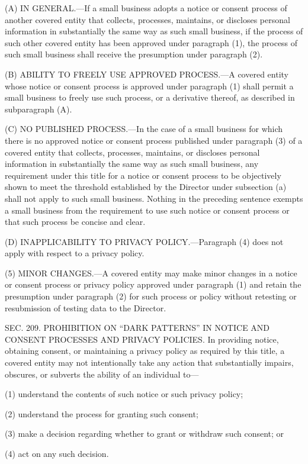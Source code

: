 (A) IN GENERAL.—If a small business adopts a notice or consent process of another covered entity that collects, processes, maintains, or discloses personal information in substantially the same way as such small business, if the process of such other covered entity has been approved under paragraph (1), the process of such small business shall receive the presumption under paragraph (2).

(B) ABILITY TO FREELY USE APPROVED PROCESS.—A covered entity whose notice or consent process is approved under paragraph (1) shall permit a small business to freely use such process, or a derivative thereof, as described in subparagraph (A).

(C) NO PUBLISHED PROCESS.—In the case of a small business for which there is no approved notice or consent process published under paragraph (3) of a covered entity that collects, processes, maintains, or discloses personal information in substantially the same way as such small business, any requirement under this title for a notice or consent process to be objectively shown to meet the threshold established by the Director under subsection (a) shall not apply to such small business. Nothing in the preceding sentence exempts a small business from the requirement to use such notice or consent process or that such process be concise and clear.

(D) INAPPLICABILITY TO PRIVACY POLICY.—Paragraph (4) does not apply with respect to a privacy policy.

(5) MINOR CHANGES.—A covered entity may make minor changes in a notice or consent process or privacy policy approved under paragraph (1) and retain the presumption under paragraph (2) for such process or policy without retesting or resubmission of testing data to the Director.


SEC. 209. PROHIBITION ON “DARK PATTERNS” IN NOTICE AND CONSENT PROCESSES AND PRIVACY POLICIES.
In providing notice, obtaining consent, or maintaining a privacy policy as required by this title, a covered entity may not intentionally take any action that substantially impairs, obscures, or subverts the ability of an individual to—

(1) understand the contents of such notice or such privacy policy;

(2) understand the process for granting such consent;

(3) make a decision regarding whether to grant or withdraw such consent; or

(4) act on any such decision.


